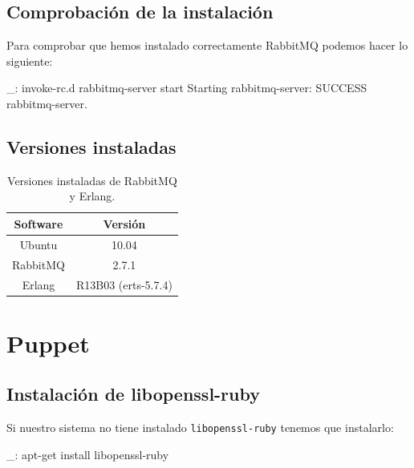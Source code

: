 \subsection{Comprobación de la instalación}

Para comprobar que hemos instalado correctamente RabbitMQ podemos hacer lo siguiente:

\begin{bashcode}
_: invoke-rc.d rabbitmq-server start
Starting rabbitmq-server: SUCCESS
rabbitmq-server.
\end{bashcode}


\subsection{Versiones instaladas}

\begin{table}[!htbp]
\centering
   \begin{tabular}{|c|c|}
      \hline
      \textbf{Software} & \textbf{Versión} \\ \hline
      Ubuntu & 10.04 \\ \hline
      RabbitMQ & 2.7.1 \\ \hline
      Erlang & R13B03 (erts-5.7.4) \\ \hline
   \end{tabular}
\caption{Versiones instaladas de RabbitMQ y Erlang.}
\label{table:rabbitmq-versions}
\end{table}


\section{Puppet}
\label{anx:inst-puppet}


\subsection{Instalación de libopenssl-ruby}

Si nuestro sistema no tiene instalado \texttt{libopenssl-ruby} tenemos que instalarlo:

\begin{bashcode}
_: apt-get install libopenssl-ruby
\end{bashcode}


